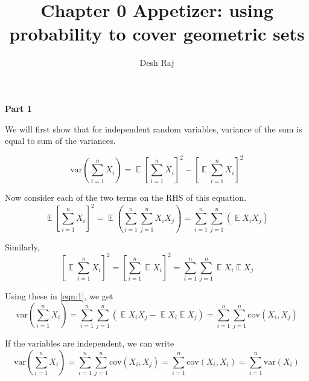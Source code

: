 \documentclass[11pt]{article}
\newenvironment{exercise}[2][Exercise]{\begin{trivlist}
\item[\hskip \labelsep {\bfseries #1}\hskip \labelsep {\bfseries #2.}]}{\end{trivlist}}
\newenvironment{solution}[1][Solution]{\begin{trivlist}
\item[\hskip \labelsep {\bfseries #1}\hskip \labelsep]}{\end{trivlist}}
\DeclareMathOperator*{\E}{\mathbb{E}}
\begin{document}
 
 
\title{Chapter 0 Appetizer: using probability to cover geometric sets}
\author{Desh Raj} 
 
\maketitle
 
\begin{exercise}{0.1.3}
\end{exercise}
 
\begin{solution}
\textbf{Part 1}

We will first show that for independent random variables, variance of the sum is equal to sum of the variances.

\begin{equation}
\label{eqn:1}
\text{var}\left( \sum_{i=1}^n X_i \right) = \E \left[ \sum_{i=1}^n X_i \right] ^2 - \left[ \E \sum_{i=1}^n X_i \right]^2 
\end{equation}

Now consider each of the two terms on the RHS of this equation.
\begin{equation*}
\E \left[ \sum_{i=1}^n X_i \right] ^2 = \E \left( \sum_{i=1}^n \sum_{j=1}^n X_i X_j \right) 
	=   \sum_{i=1}^n \sum_{j=1}^n \left( \E X_i X_j \right)
\end{equation*}

Similarly,
\begin{equation*}
\left[ \E \sum_{i=1}^n X_i \right]^2 = \left[ \sum_{i=1}^n \E X_i \right]^2 
	= \sum_{i=1}^n \sum_{j=1}^n \E X_i \E X_j  
\end{equation*}

Using these in \ref{eqn:1}, we get
\begin{equation*}
\text{var}\left( \sum_{i=1}^n X_i \right) = \sum_{i=1}^n \sum_{j=1}^n \left( \E X_i X_j - \E X_i \E X_j \right) =  \sum_{i=1}^n \sum_{j=1}^n \text{cov} (X_i, X_j)
\end{equation*}

If the variables are independent, we can write
\begin{equation*}
\text{var}\left( \sum_{i=1}^n X_i \right) = \sum_{i=1}^n \sum_{j=1}^n \text{cov} (X_i, X_j)
	= \sum_{i=1}^n \text{cov} (X_i, X_i) = \sum_{i=1}^n \text{var}(X_i)
\end{equation*}


\end{solution}
\end{document}
